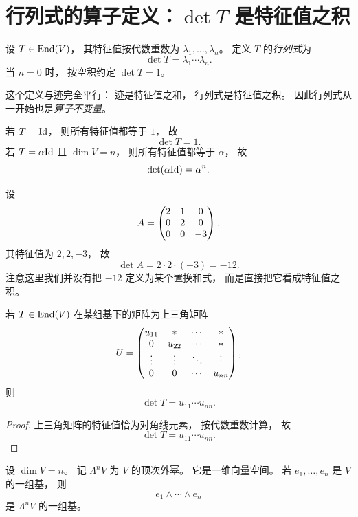 \section{行列式的算子定义：\(\det T\) 是特征值之积}




\begin{definition} 设 \(T\in \mathrm{End}(V)\)， 其特征值按代数重数为 \(\lambda_1,\dots,\lambda_n\)。 定义 \(T\) 的\emph{行列式}为 \[ \det T=\lambda_1\cdots\lambda_n. \] 当 \(n=0\) 时， 按空积约定 \(\det T=1\)。 \end{definition} 这个定义与迹完全平行： 迹是特征值之和， 行列式是特征值之积。 因此行列式从一开始也是\emph{算子不变量}。




\begin{example} 若 \(T=\mathrm{Id}\)， 则所有特征值都等于 \(1\)， 故 \[ \det T=1. \] 若 \(T=\alpha \mathrm{Id}\) 且 \(\dim V=n\)， 则所有特征值都等于 \(\alpha\)， 故 \[ \det(\alpha \mathrm{Id})=\alpha^n. \] \end{example}




\begin{example} 设 \[ A=\begin{pmatrix} 2&1&0\\0&2&0\\0&0&-3 \end{pmatrix}. \] 其特征值为 \(2,2,-3\)， 故 \[ \det A=2\cdot2\cdot(-3)=-12. \] 注意这里我们并没有把 \(-12\) 定义为某个置换和式， 而是直接把它看成特征值之积。 \end{example}




\begin{proposition}\label{prop:det-triangular} 若 \(T\in \mathrm{End}(V)\) 在某组基下的矩阵为上三角矩阵 \[ U=\begin{pmatrix}  u_{11}&*&\cdots&*\\ 0&u_{22}&\cdots&*\\ \vdots&\vdots&\ddots&\vdots\\ 0&0&\cdots&u_{nn} \end{pmatrix}, \] 则 \[ \det T=u_{11}\cdots u_{nn}. \] \end{proposition}




\begin{proof} 上三角矩阵的特征值恰为对角线元素， 按代数重数计算， 故 \[ \det T=u_{11}\cdots u_{nn}. \] \end{proof}




\begin{definition} 设 \(\dim V=n\)。 记 \(\Lambda^n V\) 为 \(V\) 的顶次外幂。 它是一维向量空间。 若 \(e_1,\dots,e_n\) 是 \(V\) 的一组基， 则 \[ e_1\wedge\cdots\wedge e_n \] 是 \(\Lambda^n V\) 的一组基。 \end{definition}




